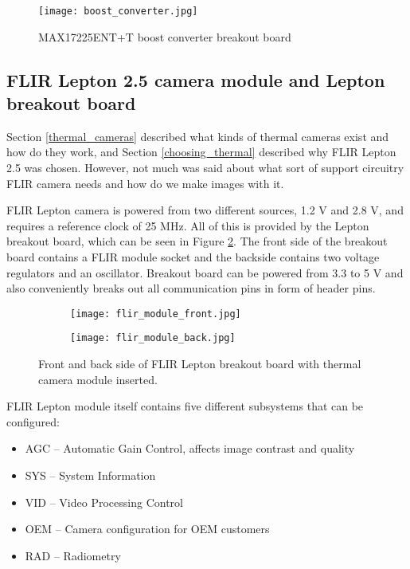 \begin{figure}[ht]
        \centering
        \texttt{[image: boost\_converter.jpg]} 
        \caption{ MAX17225ENT+T boost converter breakout board}
        \label{boost_converter}
\end{figure}

\subsection{ FLIR Lepton 2.5 camera module and Lepton breakout board}

Section \ref{thermal_cameras} described what kinds of thermal cameras exist and how do they work, and Section \ref{choosing_thermal} described why FLIR Lepton 2.5 was chosen.
However, not much was said about what sort of support circuitry FLIR camera needs and how do we make images with it.

FLIR Lepton camera is powered from two different sources, 1.2 \si{\volt} and 2.8 \si{\volt}, and requires a reference clock of 25 \si{\mega\hertz}.
All of this is provided by the Lepton breakout board, which can be seen in Figure \ref{lepton_breakout}.
The front side of the breakout board contains a FLIR module socket and the backside contains two voltage regulators and an oscillator.
Breakout board can be powered from 3.3 to 5 \si{\volt} and also conveniently breaks out all communication pins in form of header pins.

\begin{figure}[ht] 
    \begin{subfigure}[b]{0.5\textwidth}
        \centering
        \texttt{[image: flir\_module\_front.jpg]} 
    \end{subfigure}
    \begin{subfigure}[b]{0.5\textwidth}
        \centering
        \texttt{[image: flir\_module\_back.jpg]} 
    \end{subfigure}
    \caption{ Front and back side of FLIR Lepton breakout board with thermal camera module inserted.}
    \label{lepton_breakout}
\end{figure}

FLIR Lepton module itself contains five different subsystems that can be configured:

\begin{itemize}
    \item AGC – Automatic Gain Control, affects image contrast and quality
    \item SYS – System Information
    \item VID – Video Processing Control
    \item OEM – Camera configuration for OEM customers
    \item RAD – Radiometry
\end{itemize}


